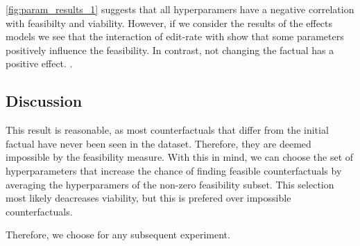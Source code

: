 \documentclass[./../../paper.tex]{subfiles}
\begin{document}


\autoref{fig:param_results_1} suggests that all hyperparamers have a negative correlation with feasibilty and viability. However, if we consider the results of the effects models we see that the interaction of edit-rate with  show that some parameters positively influence the feasibility. In contrast, not changing the factual has a positive effect. . 

\subsection{Discussion}
This result is reasonable, as most counterfactuals that differ from the initial factual have never been seen in the dataset. Therefore, they are deemed impossible by the feasibility measure. With this in mind, we can choose the set of hyperparameters that increase the chance of finding feasible counterfactuals by averaging the hyperparamers of the non-zero feasibility subset. This selection most likely deacreases viability, but this is prefered over impossible counterfactuals. 

Therefore, we choose  for any subsequent experiment.
\end{document}
